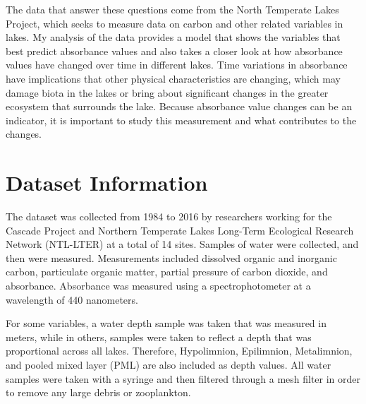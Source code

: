 \documentclass[12pt,]{article}
\begin{document}
The data that answer these questions come from the North Temperate Lakes
Project, which seeks to measure data on carbon and other related
variables in lakes. My analysis of the data provides a model that shows
the variables that best predict absorbance values and also takes a
closer look at how absorbance values have changed over time in different
lakes. Time variations in absorbance have implications that other
physical characteristics are changing, which may damage biota in the
lakes or bring about significant changes in the greater ecosystem that
surrounds the lake. Because absorbance value changes can be an
indicator, it is important to study this measurement and what
contributes to the changes.

\newpage

\section{Dataset Information}\label{dataset-information}

The dataset was collected from 1984 to 2016 by researchers working for
the Cascade Project and Northern Temperate Lakes Long-Term Ecological
Research Network (NTL-LTER) at a total of 14 sites. Samples of water
were collected, and then were measured. Measurements included dissolved
organic and inorganic carbon, particulate organic matter, partial
pressure of carbon dioxide, and absorbance. Absorbance was measured
using a spectrophotometer at a wavelength of 440 nanometers.

For some variables, a water depth sample was taken that was measured in
meters, while in others, samples were taken to reflect a depth that was
proportional across all lakes. Therefore, Hypolimnion, Epilimnion,
Metalimnion, and pooled mixed layer (PML) are also included as depth
values. All water samples were taken with a syringe and then filtered
through a mesh filter in order to remove any large debris or
zooplankton.
\end{document}
